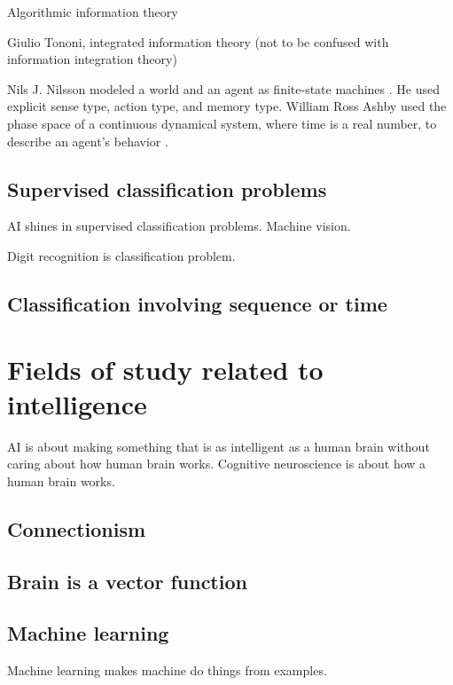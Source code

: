 \cite{PickeringCyber}
\cite{GoertzelAgi}
\cite{SlomanTuringIrrelevance}

Algorithmic information theory
\cite{AlgoInfTh}

Giulio Tononi, integrated information theory
(not to be confused with information integration theory)

Nils J. Nilsson modeled a world and an agent as finite-state machines \cite{NilsLogicAi}.
He used explicit sense type, action type, and memory type.
William Ross Ashby used the phase space of a continuous dynamical system,
where time is a real number,
to describe an agent's behavior \cite{AshbyBrain}.

\section{Supervised classification problems}

AI shines in supervised classification problems.
Machine vision.

Digit recognition is classification problem.

\section{Classification involving sequence or time}

\chapter{Fields of study related to intelligence}

AI is about making something
that is as intelligent as a human brain
without caring about how human brain works.
Cognitive neuroscience is about how a human brain works.

\section{Connectionism}

\section{Brain is a vector function}

\section{Machine learning}

Machine learning makes machine do things from examples.

